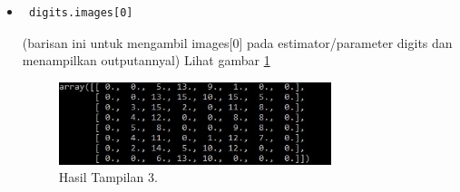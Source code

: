 \begin{itemize}
\item\begin{verbatim} digits.images[0]\end{verbatim}(barisan ini untuk mengambil images[0] pada estimator/parameter digits dan menampilkan outputannyal) Lihat gambar \ref{12}
\begin{figure}[!htbp]\centerline{\includegraphics[width=0.75\textwidth]{figures/huda/12.JPG}}\caption{Hasil Tampilan 3.}\label{12}\end{figure}
\end{itemize}
